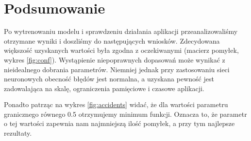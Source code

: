 \documentclass[12pt]{article}
\begin{document}
	\section{Podsumowanie}
	Po wytrenowaniu modelu i sprawdzeniu działania aplikacji przeanalizowaliśmy otrzymane wyniki i doszliśmy do następujących wniosków.
	Zdecydowana większość uzyskanych wartości była zgodna z oczekiwanymi (macierz pomyłek, wykres \ref{fig:conf}). Wystąpienie niepoprawnych dopasowań może wynikać z nieidealnego dobrania parametrów. Niemniej jednak przy zastosowaniu sieci neuronowych obecność błędów jest normalna, a uzyskana pewność jest zadowalająca na skalę, ograniczenia pamięciowe i czasowe aplikacji.
	
	Ponadto patrząc na wykres \ref{fig:accidents} widać, że dla wartości parametru granicznego równego 0.5 otrzymujemy minimum funkcji. Oznacza to, że parametr o tej wartości zapewnia nam najmniejszą ilość pomyłek, a przy tym najlepsze rezultaty.
	
\end{document}
